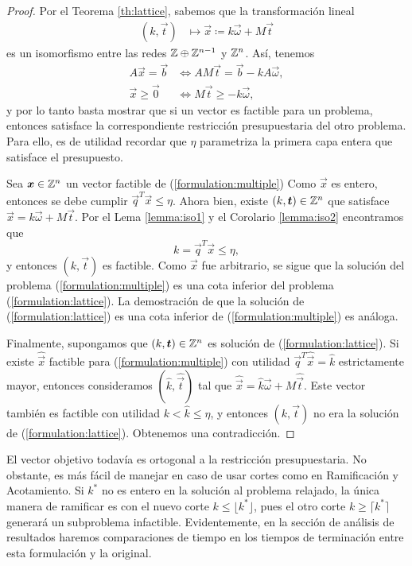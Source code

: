 \begin{proof}
	Por el Teorema \ref{th:lattice}, sabemos que la transformación lineal
	\begin{align*}
		(k, \vec{t}) &\mapsto \vec{x} \coloneq k\vec{\omega} + M\vec{t}
	\end{align*}
	es un isomorfismo entre las redes $\mathbb{Z} \oplus \mathbb{Z}^{n - 1}$ y $\mathbb{Z}^n$. Así, tenemos
	\begin{align*}
		A\vec{x} = \vec{b} &\iff AM\vec{t} = \vec{b} - kA\vec{\omega}, \\
		\vec{x} \geq \vec{0} &\iff M\vec{t} \geq -k\vec{\omega},
	\end{align*}
	y por lo tanto basta mostrar que si un vector es factible para un problema, entonces satisface
	la correspondiente restricción presupuestaria del otro problema. Para ello, es de utilidad
	recordar que $\eta$ parametriza la primera capa entera que satisface el presupuesto.

	Sea $\boldsymbol{x} \in \mathbb{Z}^n$ un vector factible de (\ref{formulation:multiple}) Como $\vec{x}$ es
	entero, entonces se debe cumplir $\vec{q}^T\vec{x} \leq \eta$. Ahora bien, existe $(k, \boldsymbol{t})
	\in \mathbb{Z}^n$ que satisface $\vec{x} = k\vec{\omega} + M\vec{t}$. Por el Lema \ref{lemma:iso1} y el
	Corolario \ref{lemma:iso2} encontramos que
	\begin{equation*}
		k = \vec{q}^T\vec{x} \leq \eta,
	\end{equation*}
	y entonces $(k, \vec{t})$ es factible. Como $\vec{x}$ fue arbitrario, se sigue que la solución
	del problema (\ref{formulation:multiple}) es una cota inferior del problema
	(\ref{formulation:lattice}). La demostración de que la solución de (\ref{formulation:lattice})
	es una cota inferior de (\ref{formulation:multiple}) es análoga.

	Finalmente, supongamos que $(k, \boldsymbol{t}) \in \mathbb{Z}^n$ es solución de (\ref{formulation:lattice}).
	Si existe $\hat{\vec{x}}$ factible para (\ref{formulation:multiple}) con utilidad
	$\vec{q}^T\hat{\vec{x}} = \hat{k}$ estrictamente mayor, entonces consideramos $(\hat{k},
	\hat{\vec{t}})$ tal que $\hat{\vec{x}} = \hat{k}\vec{\omega} + M\hat{\vec{t}}$. Este vector
	también es factible con utilidad $k < \hat{k} \leq \eta$, y entonces $(k, \vec{t})$ no era la
	solución de (\ref{formulation:lattice}). Obtenemos una contradicción.
\end{proof}

\begin{observation}
	El vector objetivo todavía es ortogonal a la restricción presupuestaria. No obstante, es más
	fácil de manejar en caso de usar cortes como en Ramificación y Acotamiento. Si $k^*$ no es
	entero en la solución al problema relajado, la única manera de ramificar es con el nuevo corte
	$k \leq \lfloor k^* \rfloor$, pues el otro corte $k \geq \lceil k^* \rceil$ generará un
	subproblema infactible. Evidentemente, en la sección de análisis de resultados haremos
	comparaciones de tiempo en los tiempos de terminación entre esta formulación y la original.
\end{observation}

